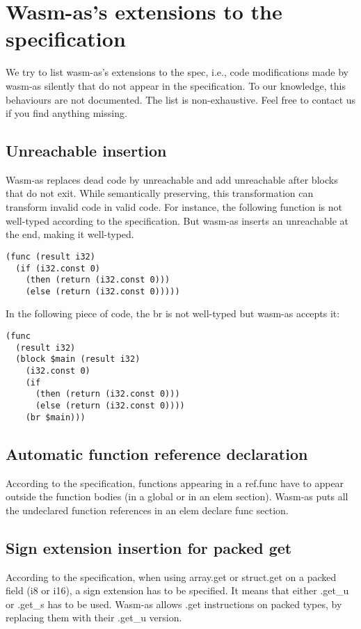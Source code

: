 \documentclass[a4paper,11pt]{article}
\begin{document}
\newpage
\appendix
\section{Wasm-as's extensions to the specification}\label{wasmasex}
We try to list wasm-as's extensions to the spec, i.e., code modifications made by
wasm-as silently that do not appear in the specification. To our knowledge, this
behaviours are not documented. The list is non-exhaustive. Feel free to contact
us if you find anything missing.
\subsection{\textsf{Unreachable} insertion}
Wasm-as replaces dead code by \textsf{unreachable} and add
\textsf{unreachable} after blocks that do not exit. While semantically
preserving, this transformation can transform invalid code in valid code. For
instance, the following function is not well-typed according to the specification. But
wasm-as inserts an \textsf{unreachable} at the end, making it well-typed.
\begin{lstlisting}
(func (result i32)
  (if (i32.const 0)
    (then (return (i32.const 0)))
    (else (return (i32.const 0)))))
\end{lstlisting}

In the following piece of code, the \textsf{br} is not well-typed but wasm-as accepts
it:
\begin{lstlisting}
(func
  (result i32)
  (block $main (result i32)
    (i32.const 0)
    (if
      (then (return (i32.const 0)))
      (else (return (i32.const 0))))
    (br $main)))
\end{lstlisting}
\subsection{Automatic function reference declaration}
According to the specification, functions appearing in a \textsf{ref.func} have to
appear outside the function bodies (in a global or in an elem section). Wasm-as
puts all the undeclared function references in an \textsf{elem declare func} section.

\subsection{Sign extension insertion for packed get}
According to the specification, when using \textsf{array.get} or
\textsf{struct.get} on a packed field (\textsf{i8} or \textsf{i16}), a sign
extension has to be specified. It means that either \textsf{.get\_u} or
\textsf{.get\_s} has to be used. Wasm-as allows \textsf{.get} instructions on
packed types, by replacing them with their \textsf{.get\_u} version.
\end{document}
